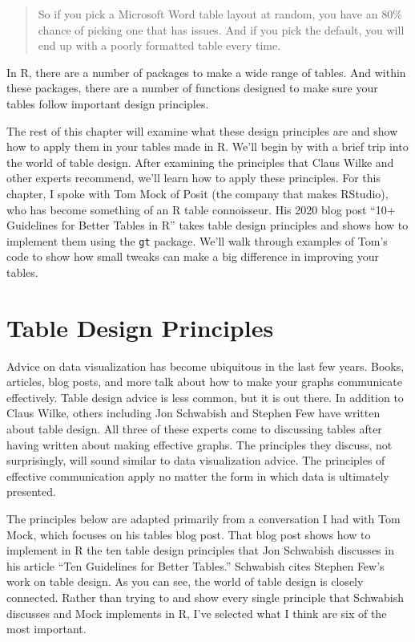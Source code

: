 \documentclass[
]{book}
\begin{document}
\begin{quote}
So if you pick a Microsoft Word table layout at random, you have an 80\% chance of picking one that has issues. And if you pick the default, you will end up with a poorly formatted table every time.
\end{quote}

In R, there are a number of packages to make a wide range of tables. And within these packages, there are a number of functions designed to make sure your tables follow important design principles.

The rest of this chapter will examine what these design principles are and show how to apply them in your tables made in R. We'll begin by with a brief trip into the world of table design. After examining the principles that Claus Wilke and other experts recommend, we'll learn how to apply these principles. For this chapter, I spoke with Tom Mock of Posit (the company that makes RStudio), who has become something of an R table connoisseur. His 2020 blog post ``10+ Guidelines for Better Tables in R'' takes table design principles and shows how to implement them using the \texttt{gt} package. We'll walk through examples of Tom's code to show how small tweaks can make a big difference in improving your tables.

\hypertarget{table-design-principles}{%
\section*{Table Design Principles}\label{table-design-principles}}

Advice on data visualization has become ubiquitous in the last few years. Books, articles, blog posts, and more talk about how to make your graphs communicate effectively. Table design advice is less common, but it is out there. In addition to Claus Wilke, others including Jon Schwabish and Stephen Few have written about table design. All three of these experts come to discussing tables after having written about making effective graphs. The principles they discuss, not surprisingly, will sound similar to data visualization advice. The principles of effective communication apply no matter the form in which data is ultimately presented.

The principles below are adapted primarily from a conversation I had with Tom Mock, which focuses on his tables blog post. That blog post shows how to implement in R the ten table design principles that Jon Schwabish discusses in his article ``Ten Guidelines for Better Tables.'' Schwabish cites Stephen Few's work on table design. As you can see, the world of table design is closely connected. Rather than trying to and show every single principle that Schwabish discusses and Mock implements in R, I've selected what I think are six of the most important.
\end{document}
